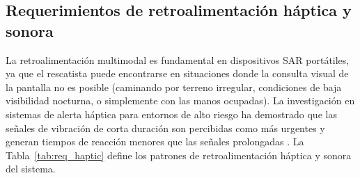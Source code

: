 \subsection{Requerimientos de retroalimentación háptica y sonora}

La retroalimentación multimodal es fundamental en dispositivos SAR portátiles, ya que el rescatista puede encontrarse en situaciones donde la consulta visual de la pantalla no es posible (caminando por terreno irregular, condiciones de baja visibilidad nocturna, o simplemente con las manos ocupadas). La investigación en sistemas de alerta háptica para entornos de alto riesgo ha demostrado que las señales de vibración de corta duración son percibidas como más urgentes y generan tiempos de reacción menores que las señales prolongadas \cite{hapticvest2025pmc}. La Tabla~\ref{tab:req_haptic} define los patrones de retroalimentación háptica y sonora del sistema.

